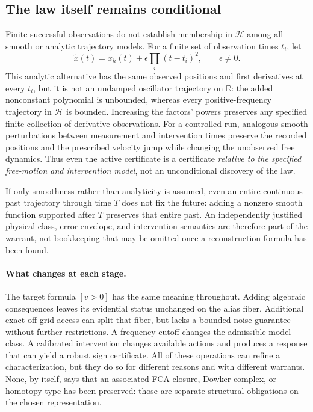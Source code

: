 \documentclass[11pt]{article}
\theoremstyle{definition}
\begin{document}
\subsection{The law itself remains conditional}

Finite successful observations do not establish membership in
$\mathcal H$ among all smooth or analytic trajectory models. For a finite
set of observation times $t_i$, let
\[
 \widetilde x(t)=x_h(t)+\epsilon\prod_i(t-t_i)^2,
 \qquad\epsilon\ne0.
\]
This analytic alternative has the same observed positions and first
derivatives at every $t_i$, but it is not an undamped oscillator trajectory
on $\mathbb R$: the added nonconstant polynomial is unbounded, whereas
every positive-frequency trajectory in $\mathcal H$ is bounded. Increasing
the factors' powers preserves any specified finite collection of derivative
observations. For a controlled run, analogous smooth perturbations between
measurement and intervention times preserve the recorded positions and the
prescribed velocity jump while changing the unobserved free dynamics.
Thus even the active certificate is a certificate \emph{relative to the
specified free-motion and intervention model}, not an unconditional discovery
of the law.

If only smoothness rather than analyticity is assumed, even an entire
continuous past trajectory through time $T$ does not fix the future:
adding a nonzero smooth function supported after $T$ preserves that entire
past. An independently justified physical class, error envelope, and
intervention semantics are therefore part of the warrant, not bookkeeping
that may be omitted once a reconstruction formula has been found.

\paragraph{What changes at each stage.}
The target formula $[v>0]$ has the same meaning throughout. Adding algebraic
consequences leaves its evidential status unchanged on the alias fiber.
Additional exact off-grid access can split that fiber, but lacks a bounded-noise
guarantee without further restrictions. A frequency cutoff changes the
admissible model class. A calibrated intervention changes available actions
and produces a response that can yield a robust sign certificate. All of
these operations can refine a characterization, but they do so for different
reasons and with different warrants. None, by itself, says that an associated
FCA closure, Dowker complex, or homotopy type has been preserved: those are
separate structural obligations on the chosen representation.
\end{document}
